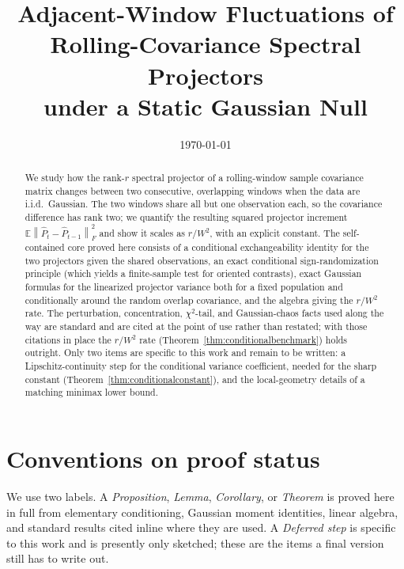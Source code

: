 \documentclass[11pt]{article}
\title{Adjacent-Window Fluctuations of\\
Rolling-Covariance Spectral Projectors\\
under a Static Gaussian Null}
\date{\today}
\theoremstyle{tightplain}
\theoremstyle{tightdef}
\newcommand{\E}{\mathbb E}
\newcommand{\norm}[1]{\left\lVert #1 \right\rVert}
\newcommand{\Phat}{\widehat P}
\begin{document}
\maketitle

\begin{abstract}
We study how the rank-$r$ spectral projector of a rolling-window sample covariance
matrix changes between two consecutive, overlapping windows when the data are
i.i.d.\ Gaussian. The two windows share all but one observation each, so the
covariance difference has rank two; we quantify the resulting squared projector
increment $\E\norm{\Phat_t-\Phat_{t-1}}_F^2$ and show it scales as $r/W^2$, with an
explicit constant. The self-contained core proved here consists of a conditional
exchangeability identity for the two projectors given the shared observations, an
exact conditional sign-randomization principle (which yields a finite-sample test for
oriented contrasts), exact Gaussian formulas for the linearized projector variance
both for a fixed population and conditionally around the random overlap covariance,
and the algebra giving the $r/W^2$ rate. The perturbation, concentration,
$\chi^2$-tail, and Gaussian-chaos facts used along the way are standard and are cited
at the point of use rather than restated; with those citations in place the $r/W^2$
rate (Theorem~\ref{thm:conditionalbenchmark}) holds outright. Only two items are
specific to this work and remain to be written: a Lipschitz-continuity step for the
conditional variance coefficient, needed for the sharp constant
(Theorem~\ref{thm:conditionalconstant}), and the local-geometry details of a matching
minimax lower bound.
\end{abstract}

\section{Conventions on proof status}

We use two labels. A \emph{Proposition}, \emph{Lemma}, \emph{Corollary}, or
\emph{Theorem} is proved here in full from elementary conditioning, Gaussian moment
identities, linear algebra, and standard results cited inline where they are used. A
\emph{Deferred step} is specific to this work and is presently only sketched; these
are the items a final version still has to write out.
\end{document}
